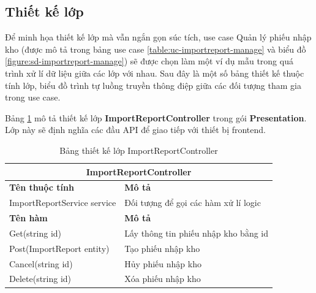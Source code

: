 \documentclass[../DoAn.tex]{subfiles}
\begin{document}
\subsection{Thiết kế lớp}
\label{subsection:detaildesign-class}

Để minh họa thiết kế lớp mà vẫn ngắn gọn súc tích, use case Quản lý phiếu nhập kho (được mô tả trong bảng use case \ref{table:uc-importreport-manage} và biểu đồ \ref{figure:sd-importreport-manage}) sẽ được chọn làm một ví dụ mẫu trong quá trình xử lí dữ liệu giữa các lớp với nhau. Sau đây là một số bảng thiết kế thuộc tính lớp, biểu đồ trình tự luồng truyền thông điệp giữa các đối tượng tham gia trong use case.

Bảng \ref{table:class-importreportcontroller} mô tả thiết kế lớp \textbf{ImportReportController} trong gói \textbf{Presentation}. Lớp này sẽ định nghĩa các đầu API để giao tiếp với thiết bị frontend.
\begin{table}[H]
    \begin{tabularx}{\textwidth}{|l|X|}
        \hline
        \multicolumn{2}{|c|}{\textbf{ImportReportController}}              \\ \hline
        \textbf{Tên thuộc tính}     & \textbf{Mô tả}                       \\ \hline
        ImportReportService service & Đối tượng để gọi các hàm xử lí logic \\ \hline
        \textbf{Tên hàm}            & \textbf{Mô tả}                       \\ \hline
        Get(string id)              & Lấy thông tin phiếu nhập kho bằng id \\ \hline
        Post(ImportReport entity)   & Tạo phiếu nhập kho                   \\ \hline
        Cancel(string id)           & Hủy phiếu nhập kho                   \\ \hline
        Delete(string id)           & Xóa phiếu nhập kho                   \\ \hline
    \end{tabularx}
    \caption{Bảng thiết kế lớp ImportReportController}
    \label{table:class-importreportcontroller}
\end{table}
\break
\end{document}
